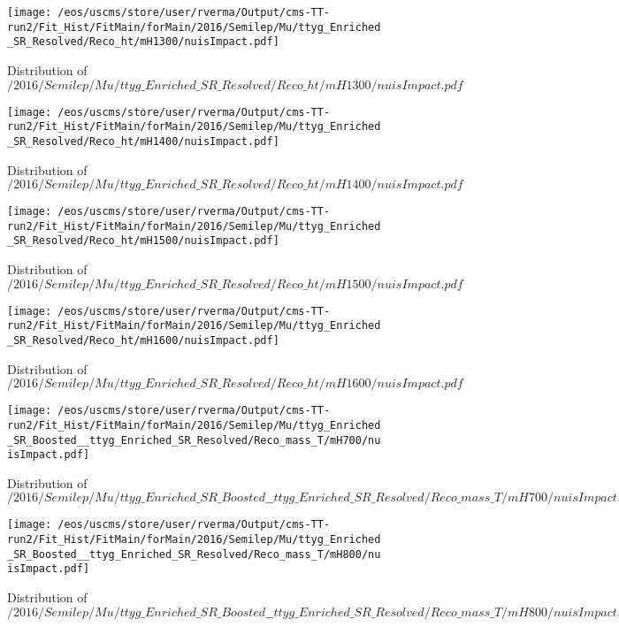 \begin{figure}
\centering
\texttt{[image: /eos/uscms/store/user/rverma/Output/cms-TT-run2/Fit\_Hist/FitMain/forMain/2016/Semilep/Mu/ttyg\_Enriched\_SR\_Resolved/Reco\_ht/mH1300/nuisImpact.pdf]}
\caption{Distribution of $/2016/Semilep/Mu/ttyg\_Enriched\_SR\_Resolved/Reco\_ht/mH1300/nuisImpact.pdf$}
\end{figure}

\begin{figure}
\centering
\texttt{[image: /eos/uscms/store/user/rverma/Output/cms-TT-run2/Fit\_Hist/FitMain/forMain/2016/Semilep/Mu/ttyg\_Enriched\_SR\_Resolved/Reco\_ht/mH1400/nuisImpact.pdf]}
\caption{Distribution of $/2016/Semilep/Mu/ttyg\_Enriched\_SR\_Resolved/Reco\_ht/mH1400/nuisImpact.pdf$}
\end{figure}

\begin{figure}
\centering
\texttt{[image: /eos/uscms/store/user/rverma/Output/cms-TT-run2/Fit\_Hist/FitMain/forMain/2016/Semilep/Mu/ttyg\_Enriched\_SR\_Resolved/Reco\_ht/mH1500/nuisImpact.pdf]}
\caption{Distribution of $/2016/Semilep/Mu/ttyg\_Enriched\_SR\_Resolved/Reco\_ht/mH1500/nuisImpact.pdf$}
\end{figure}

\begin{figure}
\centering
\texttt{[image: /eos/uscms/store/user/rverma/Output/cms-TT-run2/Fit\_Hist/FitMain/forMain/2016/Semilep/Mu/ttyg\_Enriched\_SR\_Resolved/Reco\_ht/mH1600/nuisImpact.pdf]}
\caption{Distribution of $/2016/Semilep/Mu/ttyg\_Enriched\_SR\_Resolved/Reco\_ht/mH1600/nuisImpact.pdf$}
\end{figure}

\begin{figure}
\centering
\texttt{[image: /eos/uscms/store/user/rverma/Output/cms-TT-run2/Fit\_Hist/FitMain/forMain/2016/Semilep/Mu/ttyg\_Enriched\_SR\_Boosted\_\_ttyg\_Enriched\_SR\_Resolved/Reco\_mass\_T/mH700/nuisImpact.pdf]}
\caption{Distribution of $/2016/Semilep/Mu/ttyg\_Enriched\_SR\_Boosted\_\_ttyg\_Enriched\_SR\_Resolved/Reco\_mass\_T/mH700/nuisImpact.pdf$}
\end{figure}

\begin{figure}
\centering
\texttt{[image: /eos/uscms/store/user/rverma/Output/cms-TT-run2/Fit\_Hist/FitMain/forMain/2016/Semilep/Mu/ttyg\_Enriched\_SR\_Boosted\_\_ttyg\_Enriched\_SR\_Resolved/Reco\_mass\_T/mH800/nuisImpact.pdf]}
\caption{Distribution of $/2016/Semilep/Mu/ttyg\_Enriched\_SR\_Boosted\_\_ttyg\_Enriched\_SR\_Resolved/Reco\_mass\_T/mH800/nuisImpact.pdf$}
\end{figure}

